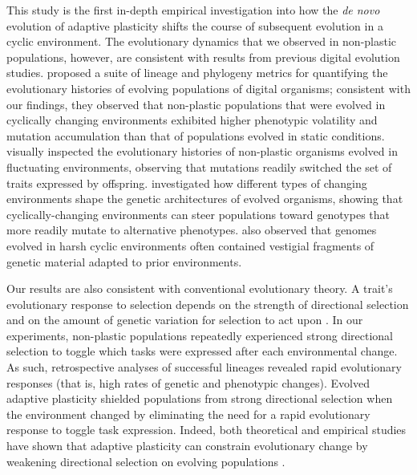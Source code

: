 This study is the first in-depth empirical investigation into how the \textit{de novo} evolution of adaptive plasticity shifts the course of subsequent evolution in a cyclic environment.
The evolutionary dynamics that we observed in non-plastic populations, however, are consistent with results from previous digital evolution studies. 
\cite{dolson_interpreting_2020} proposed a suite of lineage and phylogeny metrics for quantifying the evolutionary histories of evolving populations of digital organisms; consistent with our findings, they observed that non-plastic populations that were evolved in cyclically changing environments exhibited higher phenotypic volatility and mutation accumulation than that of populations evolved in static conditions.
\cite{lalejini_evolutionary_2016} visually inspected the evolutionary histories of non-plastic organisms evolved in fluctuating environments, observing that mutations readily switched the set of traits expressed by offspring.
\cite{canino-koning_evolution_2016} investigated how different types of changing environments shape the genetic architectures of evolved organisms, showing that cyclically-changing environments can steer populations toward genotypes that more readily mutate to alternative phenotypes.
\cite{canino-koning_evolution_2016} also observed that genomes evolved in harsh cyclic environments often contained vestigial fragments of genetic material adapted to prior environments.


Our results are also consistent with conventional evolutionary theory.
A trait's evolutionary response to selection depends on the strength of directional selection and on the amount of genetic variation for selection to act upon \citep{lande_measurement_1983,zimmer_evolution_2013}.
In our experiments, non-plastic populations repeatedly experienced strong directional selection to toggle which tasks were expressed after each environmental change.
As such, retrospective analyses of successful lineages revealed rapid evolutionary responses (that is, high rates of genetic and phenotypic changes).
Evolved adaptive plasticity shielded populations from strong directional selection when the environment changed by eliminating the need for a rapid evolutionary response to toggle task expression.
Indeed, both theoretical and empirical studies have shown that adaptive plasticity can constrain evolutionary change by weakening directional selection on evolving populations \citep{price_role_2003,paenke_influence_2007,ghalambor_non-adaptive_2015}. 


